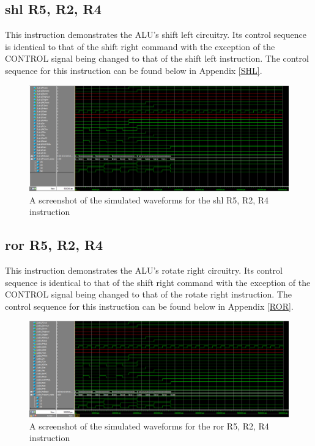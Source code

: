 \documentclass{article}
\begin{document}
    \subsection{shl R5, R2, R4}
    This instruction demonstrates the ALU's shift left circuitry. Its control sequence is identical to that of the shift right command with the exception of the CONTROL signal being changed to that of the shift left instruction. The control sequence for this instruction can be found below in Appendix \ref{SHL}.

    \begin{figure}[h!]
        \begin{center}
            \includegraphics[width=13cm]{shl}
            \caption{A screenshot of the simulated waveforms for the shl R5, R2, R4 instruction}
        \end{center}
    \end{figure}

    \subsection{ror R5, R2, R4}
    This instruction demonstrates the ALU's rotate right circuitry. Its control sequence is identical to that of the shift right command with the exception of the CONTROL signal being changed to that of the rotate right instruction. The control sequence for this instruction can be found below in Appendix \ref{ROR}.

    \begin{figure}[h!]
        \begin{center}
            \includegraphics[width=13cm]{ror}
            \caption{A screenshot of the simulated waveforms for the ror R5, R2, R4 instruction}
        \end{center}
    \end{figure}
\end{document}
